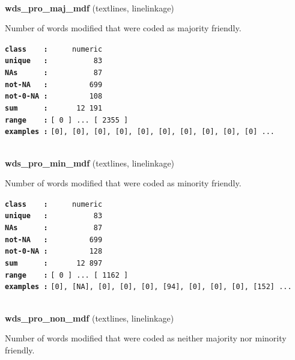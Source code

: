 \documentclass[]{article}
\begin{document}
~

\textbf{wds\_pro\_maj\_mdf} (textlines, linelinkage)

Number of words modified that were coded as majority friendly.

\textbf{\texttt{class\ \ \ \ :}} \texttt{~~~~~numeric}\\
\textbf{\texttt{unique\ \ \ :}} \texttt{~~~~~~~~~~83}\\
\textbf{\texttt{NAs\ \ \ \ \ \ :}} \texttt{~~~~~~~~~~87}\\
\textbf{\texttt{not-NA\ \ \ :}} \texttt{~~~~~~~~~699}\\
\textbf{\texttt{not-0-NA\ :}} \texttt{~~~~~~~~~108}\\
\textbf{\texttt{sum\ \ \ \ \ \ :}} \texttt{~~~~~~12~191}\\
\textbf{\texttt{range\ \ \ \ :}}
\texttt{{[}\ 0\ {]}\ ...\ {[}\ 2355\ {]}}\\
\textbf{\texttt{examples\ :}}
\texttt{{[}0{]},\ {[}0{]},\ {[}0{]},\ {[}0{]},\ {[}0{]},\ {[}0{]},\ {[}0{]},\ {[}0{]},\ {[}0{]},\ {[}0{]}\ ...}\\

~

\textbf{wds\_pro\_min\_mdf} (textlines, linelinkage)

Number of words modified that were coded as minority friendly.

\textbf{\texttt{class\ \ \ \ :}} \texttt{~~~~~numeric}\\
\textbf{\texttt{unique\ \ \ :}} \texttt{~~~~~~~~~~83}\\
\textbf{\texttt{NAs\ \ \ \ \ \ :}} \texttt{~~~~~~~~~~87}\\
\textbf{\texttt{not-NA\ \ \ :}} \texttt{~~~~~~~~~699}\\
\textbf{\texttt{not-0-NA\ :}} \texttt{~~~~~~~~~128}\\
\textbf{\texttt{sum\ \ \ \ \ \ :}} \texttt{~~~~~~12~897}\\
\textbf{\texttt{range\ \ \ \ :}}
\texttt{{[}\ 0\ {]}\ ...\ {[}\ 1162\ {]}}\\
\textbf{\texttt{examples\ :}}
\texttt{{[}0{]},\ {[}NA{]},\ {[}0{]},\ {[}0{]},\ {[}0{]},\ {[}94{]},\ {[}0{]},\ {[}0{]},\ {[}0{]},\ {[}152{]}\ ...}\\

~

\textbf{wds\_pro\_non\_mdf} (textlines, linelinkage)

Number of words modified that were coded as neither majority nor
minority friendly.
\end{document}
